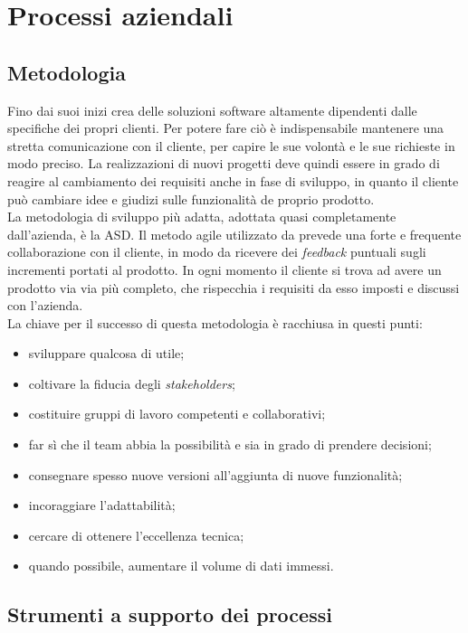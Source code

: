 \section{Processi aziendali}
\subsection{Metodologia}
Fino dai suoi inizi \azienda{} crea delle soluzioni software altamente dipendenti dalle specifiche dei propri clienti. Per potere fare ciò è indispensabile mantenere una stretta comunicazione con il cliente, per capire le sue volontà e le sue richieste in modo preciso. La realizzazioni di nuovi progetti deve quindi essere in grado di reagire al cambiamento dei requisiti anche in fase di sviluppo, in quanto il cliente può cambiare idee e giudizi sulle funzionalità de proprio prodotto.\\
La metodologia di sviluppo più adatta, adottata quasi completamente dall'azienda, è la \gls{ASD}.
Il metodo agile utilizzato da \azienda{} prevede una forte e frequente collaborazione con il cliente, in modo da ricevere dei \emph{feedback} puntuali sugli incrementi portati al prodotto. In ogni momento il cliente si trova ad avere un prodotto via via più completo, che rispecchia i requisiti da esso imposti e discussi con l'azienda.\\
La chiave per il successo di questa metodologia è racchiusa in questi punti:
\begin{itemize}
	\item sviluppare qualcosa di utile;
	\item coltivare la fiducia degli \emph{stakeholders};
	\item costituire gruppi di lavoro competenti e collaborativi;
	\item far sì che il team abbia la possibilità e sia in grado di prendere decisioni;
	\item consegnare spesso nuove versioni all'aggiunta di nuove funzionalità;
	\item incoraggiare l'adattabilità;
	\item cercare di ottenere l'eccellenza tecnica;
	\item quando possibile, aumentare il volume di dati immessi.
\end{itemize}

\subsection{Strumenti a supporto dei processi}
\label{Teconologie}
